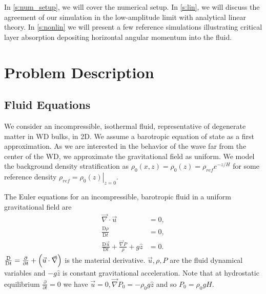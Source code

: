 \documentclass[twocolumn,
        nofootinbib,
        usenames, %
        dvipsnames %
    ]{revtex4-1}%
\newcommand*{\pd}[2]{\frac{\partial#1}{\partial#2}}
\newcommand*{\md}[2]{\frac{\mathrm{D}#1}{\mathrm{D}#2}}
\newcommand*{\at}[1]{\left.#1\right|}
\DeclarePairedDelimiter\p{\lparen}{\rparen}
\begin{document}

In \autoref{s:num_setup}, we will cover the numerical setup. In \autoref{s:lin}, we
will discuss the agreement of our simulation in the low-amplitude limit with
analytical linear theory. In \autoref{s:nonlin} we will present a few reference
simulations illustrating critical layer absorption depositing horizontal angular
momentum into the fluid.

\section{Problem Description}\label{s:num_setup}

\subsection{Fluid Equations}

We consider an incompressible, isothermal fluid, representative of degenerate
matter in WD bulks, in 2D. We assume a barotropic equation of state as a first
approximation. As we are interested in the behavior of the wave far from the
center of the WD, we approximate the gravitational field as uniform. We model
the background density stratification as $\rho_0(x, z) = \rho_0(z) = \rho_{ref}
e^{-z/H}$ for some reference density $\rho_{ref} = \at{\rho_0(z)}_{z = 0}$.

The Euler equations for an incompressible, barotropic fluid in a uniform
gravitational field are
\begin{subequations}\label{se:fc_orig}
    \begin{align}
        \vec{\nabla} \cdot \vec{u} &= 0,\\
        \md{\rho}{t} &= 0 ,\label{eq:fc_density}\\
        \md{\vec{u}}{t} + \frac{\vec{\nabla}P}{\rho} + g\hat{z} &= 0.
    \end{align}
\end{subequations}
$\md{}{t} = \pd{}{t} + \p*{\vec{u} \cdot \vec{\nabla}}$ is the material
derivative. $\vec{u}, \rho, P$ are the fluid dynamical variables and $-g\hat{z}$
is constant gravitational acceleration. Note that at hydrostatic equilibrium
$\pd{}{t} = 0$ we have $\vec{u} = 0, \vec{\nabla}P_0 = -\rho_0 g\hat{z}$ and
so $P_0 = \rho_0 gH$.
\end{document}
